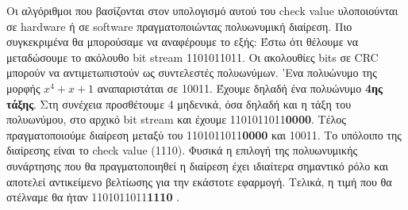 \documentclass[hidelinks, 12pt, a4paper]{article}
\begin{document}
Οι αλγόριθμοι που βασίζονται στον υπολογισμό αυτού του check value υλοποιούνται σε hardware ή σε software πραγματοποιώντας πολυωνυμική διαίρεση. Πιο συγκεκριμένα θα μπορούσαμε να αναφέρουμε το εξής: Έστω ότι θέλουμε να μεταδώσουμε το ακόλουθο bit stream 1101011011. Οι ακολουθίες bits σε CRC μπορούν να αντιμετωπιστούν ως συντελεστές πολυωνύμων. 'Ενα πολυώνυμο της μορφής $x^4 + x + 1$ αναπαριστάται σε 10011. Έχουμε δηλαδή ένα πολυώνυμο \textbf{4ης τάξης}. Στη συνέχεια προσθέτουμε 4 μηδενικά, όσα δηλαδή και η τάξη του πολυωνύμου, στο αρχικό bit stream και έχουμε 1101011011\textbf{0000}. Τέλος πραγματοποιούμε διαίρεση μεταξύ του 1101011011\textbf{0000} και 10011. Το υπόλοιπο της διαίρεσης είναι το check value (1110). Φυσικά η επιλογή της πολυωνυμικής συνάρτησης που θα πραγματοποιηθεί η διαίρεση έχει ιδιαίτερα σημαντικό ρόλο και αποτελεί αντικείμενο βελτίωσης για την εκάστοτε εφαρμογή. Τελικά, η τιμή που θα στέλναμε θα ήταν 1101011011\textbf{1110} \cite{crc}.
\clearpage



\end{document}
